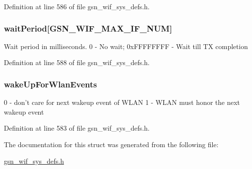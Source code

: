 Definition at line 586 of file gsn\_\-wif\_\-sys\_\-defs.h.

\hypertarget{a00364_abefee9d661c8d167ae23c6fc64b0f54e}{
\subsubsection[{waitPeriod}]{ {\bf waitPeriod}\mbox{[}GSN\_\-WIF\_\-MAX\_\-IF\_\-NUM\mbox{]}}}
\label{a00364_abefee9d661c8d167ae23c6fc64b0f54e}
Wait period in milliseconds. 0 -\/ No wait; 0xFFFFFFFF -\/ Wait till TX completion 

Definition at line 588 of file gsn\_\-wif\_\-sys\_\-defs.h.

\hypertarget{a00364_a3aa7b6bbc3592496f826582ca64fa8db}{
\subsubsection[{wakeUpForWlanEvents}]{ {\bf wakeUpForWlanEvents}}}
\label{a00364_a3aa7b6bbc3592496f826582ca64fa8db}
0 -\/ don't care for next wakeup event of WLAN 1 -\/ WLAN must honor the next wakeup event 

Definition at line 583 of file gsn\_\-wif\_\-sys\_\-defs.h.



The documentation for this struct was generated from the following file:\begin{DoxyCompactItemize}
\item 
\hyperlink{a00612}{gsn\_\-wif\_\-sys\_\-defs.h}\end{DoxyCompactItemize}
